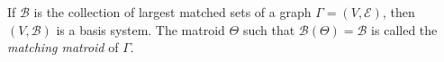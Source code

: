 If $\mathcal{B}$ is the collection of largest matched sets of a graph $\Gamma = (V, \mathcal{E})$, then $(V, \mathcal{B})$ is a basis system. The matroid $\Theta$ such that $\mathcal{B}(\Theta) = \mathcal{B}$ is called the \textit{matching matroid} of $\Gamma$.
